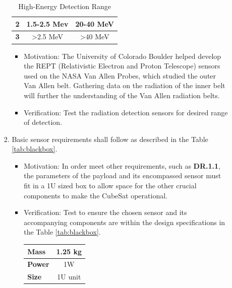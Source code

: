 \begin{enumerate}
\begin{enumerate}
\begin{enumerate}
\begin{table}[H]
\begin{tabular}{|l|c|c|}
                        \textbf{2} & 1.5-2.5 Mev & 20-40 MeV
                        \\
                        \hline
                        \textbf{3} & >2.5 MeV & >40 MeV
                        \\
                        \hline
                        \end{tabular}
                        \caption{High-Energy Detection Range}
                        \label{tab:mev}
                        \end{table}
                            \begin{itemize}
                        \item Motivation: The University of Colorado Boulder helped develop the REPT (Relativistic Electron and Proton Telescope) sensors used on the NASA Van Allen Probes, which studied the outer Van Allen belt. Gathering data on the radiation of the inner belt will further the understanding of the Van Allen radiation belts. 
                        \item Verification: Test the radiation detection sensors for desired range of detection.
                    \end{itemize}
                    \item  Basic sensor requirements shall follow as described in the Table \ref{tab:blackbox}.
                        \begin{itemize}
                            \item Motivation: In order meet other requirements, such as \textbf{DR.1.1}, the parameters of the payload and its encompassed sensor must fit in a 1U sized box to allow space for the other crucial components to make the CubeSat operational. 
                            \item Verification: Test to ensure the chosen sensor and its accompanying components are within the design specifications in the Table \ref{tab:blackbox}.
                            \begin{table}[H]
                            \centering
                            \begin{tabular}{|l|c|} 
                            \hline
                            \textbf{Mass} & 1.25 kg
                            \\
                            \hline
                            \textbf{Power} & 1W 
                            \\
                            \hline
                            \textbf{Size} & 1U unit

\end{tabular}
\end{table}
\end{itemize}
\end{enumerate}
\end{enumerate}
\end{enumerate}

